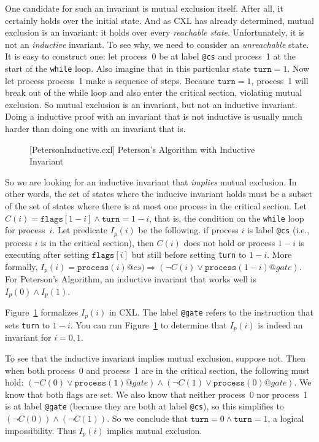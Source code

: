 \documentclass{report}
\newenvironment{code}{
\tcolorbox
}{
\endtcolorbox
}
\begin{document}
One candidate for such an invariant is mutual exclusion itself.
After all, it certainly holds over the initial state.
And as CXL has already determined, mutual exclusion is an invariant:
it holds over every \emph{reachable state}.
Unfortunately, it is not an \emph{inductive} invariant.
To see why, we need to consider an \emph{unreachable} state.
It is easy to construct one: let process~0 be at label \texttt{@cs}
and process~1 at the start of the \texttt{while} loop.
Also imagine that in this particular state $\mathtt{turn} = 1$.  Now let
process process~1 make a sequence of steps.  Because $\mathtt{turn} = 1$,
process~1 will break out of the while loop and also enter the critical
section, violating mutual exclusion.
So mutual exclusion is an invariant, but not an inductive invariant.
Doing a inductive proof with an invariant that is not inductive is usually
much harder than doing one with an invariant that is.

\begin{figure}
\begin{code}
\end{code}
\caption{[PetersonInductive.cxl] Peterson's Algorithm with Inductive Invariant}
\label{fig:petersonproof}
\end{figure}

So we are looking for an inductive invariant that \emph{implies} mutual
exclusion.  In other words, the set of states where the inducive invariant holds
must be a subset of the set of states where there is at most one process in
the critical section.
Let $C(i) = \mathtt{flags}[1 - i] \land
\mathtt{turn} = 1 - i$, that is, the condition on the \texttt{while} loop
for process~$i$.
Let predicate $I_p(i)$ be the following.
if process $i$ is label \texttt{@cs} (i.e., process $i$ is in the critical section),
then $C(i)$ does not hold or process $1-i$ is executing after setting
$\mathtt{flags}[i]$ but still before setting \texttt{turn} to $1-i$.
More formally, $I_p(i) = \mathtt{process}(i)@cs) \Rightarrow (\lnot C(i) \lor \mathtt{process}(1-i)@gate)$.
For Peterson's Algorithm, an inductive invariant that works well is
$I_p(0) \land I_p(1)$.

Figure~\ref{fig:petersonproof} formalizes $I_p(i)$ in CXL.
The label \texttt{@gate} refers to the instruction that sets \texttt{turn} to $1-i$.
You can run Figure~\ref{fig:petersonproof} to determine
that $I_p(i)$ is indeed an invariant for $i = 0, 1$.

To see that the inductive invariant implies mutual exclusion, suppose not.  Then
when both process~0 and process~1 are in the critical section, the
following must hold:
$(\lnot C(0) \lor \mathtt{process}(1)@gate) \land
 (\lnot C(1) \lor \mathtt{process}(0)@gate)$.
We know that both flags are set.
We also know that neither process~0 nor process~1 is at label \texttt{@gate}
(because they are both at label \texttt{@cs}),
so this simplifies to $(\lnot C(0)) \land (\lnot C(1))$.
So we conclude that $\mathtt{turn} = 0 \land \mathtt{turn} = 1$, a
logical impossibility.  Thus $I_p(i)$ implies mutual exclusion.
\end{document}

